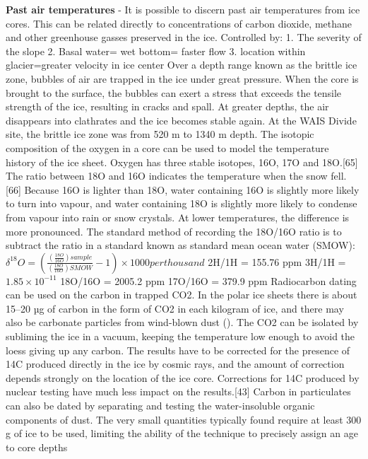             \ddd \textbf{Past air temperatures} - It is possible to discern past air temperatures from ice cores. This can be related directly to concentrations of carbon dioxide, methane and other greenhouse gasses preserved in the ice.
           	 Controlled by: 1. The severity of the slope 2. Basal water= wet bottom= faster flow 3. location within glacier=greater velocity in ice center
        	Over a depth range known as the brittle ice zone, bubbles of air are trapped in the ice under great pressure. When the core is brought to the surface, the bubbles can exert a stress that exceeds the tensile strength of the ice, resulting in cracks and spall. At greater depths, the air disappears into clathrates and the ice becomes stable again. At the WAIS Divide site, the brittle ice zone was from 520 m to 1340 m depth.
        	The isotopic composition of the oxygen in a core can be used to model the temperature history of the ice sheet. Oxygen has three stable isotopes, 16O, 17O and 18O.[65] The ratio between 18O and 16O indicates the temperature when the snow fell.[66] Because 16O is lighter than 18O, water containing 16O is slightly more likely to turn into vapour, and water containing 18O is slightly more likely to condense from vapour into rain or snow crystals. At lower temperatures, the difference is more pronounced. The standard method of recording the 18O/16O ratio is to subtract the ratio in a standard known as standard mean ocean water (SMOW): \\
        	$ \delta^{18}O = \left(\frac{\left(\frac{18O}{16O}\right) sample}{\left(\frac{18O}{16O}\right) SMOW} - 1\right) \times 1000 per thousand$
        		\ddd 2H/1H = 155.76 ppm \ddd 3H/1H = $ 1.85\times10^{-11}  $ \ddd 18O/16O = 2005.2 ppm \ddd 17O/16O = 379.9 ppm
        	Radiocarbon dating can be used on the carbon in trapped CO2. In the polar ice sheets there is about 15–20 µg of carbon in the form of CO2 in each kilogram of ice, and there may also be carbonate particles from wind-blown dust (). The CO2 can be isolated by subliming the ice in a vacuum, keeping the temperature low enough to avoid the loess giving up any carbon. The results have to be corrected for the presence of 14C produced directly in the ice by cosmic rays, and the amount of correction depends strongly on the location of the ice core. Corrections for 14C produced by nuclear testing have much less impact on the results.[43] Carbon in particulates can also be dated by separating and testing the water-insoluble organic components of dust. The very small quantities typically found require at least 300 g of ice to be used, limiting the ability of the technique to precisely assign an age to core depths
